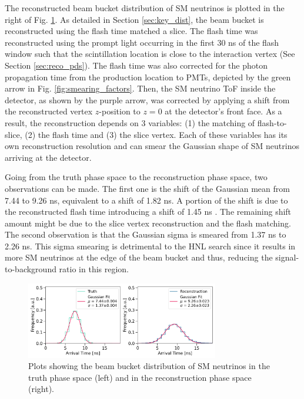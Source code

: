 The reconstructed beam bucket distribution of SM neutrinos is plotted in the right of Fig. \ref{fig:gaus_truth_reco}.
As detailed in Section \ref{sec:key_dist}, the beam bucket is reconstructed using the flash time matched a slice.
The flash time was reconstructed using the prompt light occurring in the first 30 ns of the flash window such that the scintillation location is close to the interaction vertex (See Section \ref{sec:reco_pds}).
The flash time was also corrected for the photon propagation time from the production location to PMTs, depicted by the green arrow in Fig. \ref{fig:smearing_factors}.
Then, the SM neutrino ToF inside the detector, as shown by the purple arrow, was corrected by applying a shift from the reconstructed vertex $z$-position to $z = 0$ at the detector's front face.
As a result, the reconstruction depends on 3 variables: (1) the matching of flash-to-slice, (2) the flash time and (3) the slice vertex.
Each of these variables has its own reconstruction resolution and can smear the Gaussian shape of SM neutrinos arriving at the detector.


Going from the truth phase space to the reconstruction phase space, two observations can be made.
The first one is the shift of the Gaussian mean from 7.44 to 9.26 ns, equivalent to a shift of 1.82 ns.
A portion of the shift is due to the reconstructed flash time introducing a shift of 1.45 ns \cite{sbnd_pds_paper}.
The remaining shift amount might be due to the slice vertex reconstruction and the flash matching.      
The second observation is that the Gaussian sigma is smeared from 1.37 ns to 2.26 ns. 
This sigma smearing is detrimental to the HNL search since it results in more SM neutrinos at the edge of the beam bucket and thus, reducing the signal-to-background ratio in this region.                     

\begin{figure}[hb!]
    \centering
    \includegraphics[width=0.75\textwidth]{truth_reco_gaus.png}
    \caption{Plots showing the beam bucket distribution of SM neutrinos in the truth phase space (left) and in the reconstruction phase space (right).}
    \label{fig:gaus_truth_reco}
\end{figure}

